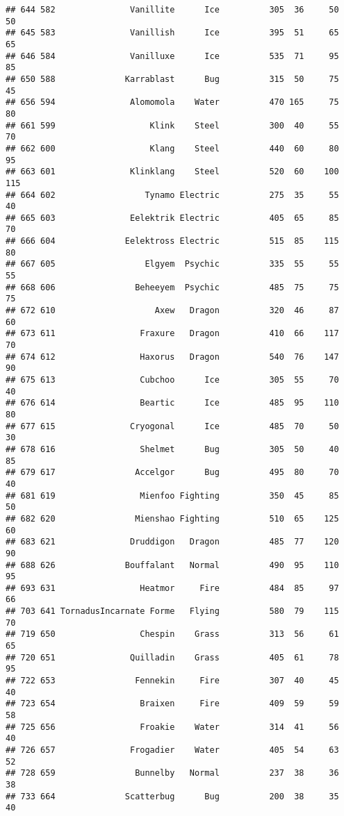 \documentclass[
]{article}
\begin{document}
\begin{verbatim}
## 644 582               Vanillite      Ice          305  36     50      50
## 645 583               Vanillish      Ice          395  51     65      65
## 646 584               Vanilluxe      Ice          535  71     95      85
## 650 588              Karrablast      Bug          315  50     75      45
## 656 594               Alomomola    Water          470 165     75      80
## 661 599                   Klink    Steel          300  40     55      70
## 662 600                   Klang    Steel          440  60     80      95
## 663 601               Klinklang    Steel          520  60    100     115
## 664 602                  Tynamo Electric          275  35     55      40
## 665 603               Eelektrik Electric          405  65     85      70
## 666 604              Eelektross Electric          515  85    115      80
## 667 605                  Elgyem  Psychic          335  55     55      55
## 668 606                Beheeyem  Psychic          485  75     75      75
## 672 610                    Axew   Dragon          320  46     87      60
## 673 611                 Fraxure   Dragon          410  66    117      70
## 674 612                 Haxorus   Dragon          540  76    147      90
## 675 613                 Cubchoo      Ice          305  55     70      40
## 676 614                 Beartic      Ice          485  95    110      80
## 677 615               Cryogonal      Ice          485  70     50      30
## 678 616                 Shelmet      Bug          305  50     40      85
## 679 617                Accelgor      Bug          495  80     70      40
## 681 619                 Mienfoo Fighting          350  45     85      50
## 682 620                Mienshao Fighting          510  65    125      60
## 683 621               Druddigon   Dragon          485  77    120      90
## 688 626              Bouffalant   Normal          490  95    110      95
## 693 631                 Heatmor     Fire          484  85     97      66
## 703 641 TornadusIncarnate Forme   Flying          580  79    115      70
## 719 650                 Chespin    Grass          313  56     61      65
## 720 651               Quilladin    Grass          405  61     78      95
## 722 653                Fennekin     Fire          307  40     45      40
## 723 654                 Braixen     Fire          409  59     59      58
## 725 656                 Froakie    Water          314  41     56      40
## 726 657               Frogadier    Water          405  54     63      52
## 728 659                Bunnelby   Normal          237  38     36      38
## 733 664              Scatterbug      Bug          200  38     35      40

\end{verbatim}
\end{document}
